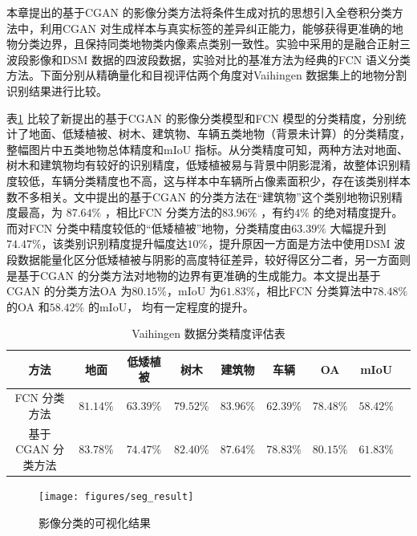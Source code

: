 本章提出的基于CGAN 的影像分类方法将条件生成对抗的思想引入全卷积分类方法中，利用CGAN 对生成样本与真实标签的差异纠正能力，能够获得更准确的地物分类边界，且保持同类地物类内像素点类别一致性。实验中采用的是融合正射三波段影像和DSM 数据的四波段数据，实验对比的基准方法为经典的FCN 语义分类方法。下面分别从精确量化和目视评估两个角度对Vaihingen 数据集上的地物分割识别结果进行比较。

表\ref{tab:seg_refult} 比较了新提出的基于CGAN 的影像分类模型和FCN 模型的分类精度，分别统计了地面、低矮植被、树木、建筑物、车辆五类地物（背景未计算）的分类精度，整幅图片中五类地物总体精度和mIoU 指标。从分类精度可知，两种方法对地面、树木和建筑物均有较好的识别精度，低矮植被易与背景中阴影混淆，故整体识别精度较低，车辆分类精度也不高，这与样本中车辆所占像素面积少，存在该类别样本数不多相关。文中提出的基于CGAN 的分类方法在“建筑物”这个类别地物识别精度最高，为 $87.64\%$ ，相比FCN 分类方法的$83.96\%$ ，有约$4\%$ 的绝对精度提升。而对FCN 分类中精度较低的“低矮植被”地物，分类精度由$63.39\%$ 大幅提升到$74.47\%$，该类别识别精度提升幅度达$10\%$，提升原因一方面是方法中使用DSM 波段数据能量化区分低矮植被与阴影的高度特征差异，较好得区分二者，另一方面则是基于CGAN 的分类方法对地物的边界有更准确的生成能力。本文提出基于CGAN 的分类方法OA 为$80.15\%$，mIoU 为$61.83\%$，相比FCN 分类算法中$78.48\%$ 的OA 和$58.42\%$ 的mIoU， 均有一定程度的提升。

\begin{table}[htbp]
  \caption{Vaihingen 数据分类精度评估表}\label{tab:seg_refult}
  \centering
  \begin{tabular}{ccccccccc}
    \toprule
    方法              & 地面      & 低矮植被  & 树木      & 建筑物    & 车辆      & OA        & mIoU               \\
    \midrule
    FCN 分类方法      & $81.14\%$ & $63.39\%$ & $79.52\%$ & $83.96\%$ & $62.39\%$ & $78.48\%$ & $58.42\%$          \\
    基于CGAN 分类方法 & $83.78\%$ & $74.47\%$ & $82.40\%$ & $87.64\%$ & $78.83\%$ & $80.15\%$ & \textbf{$61.83\%$} \\
    \bottomrule
  \end{tabular}
\end{table}

\begin{figure}[htb]
  \centering
  \texttt{[image: figures/seg\_result]}
  \caption{影像分类的可视化结果}\label{fig:seg_result}
\end{figure}


